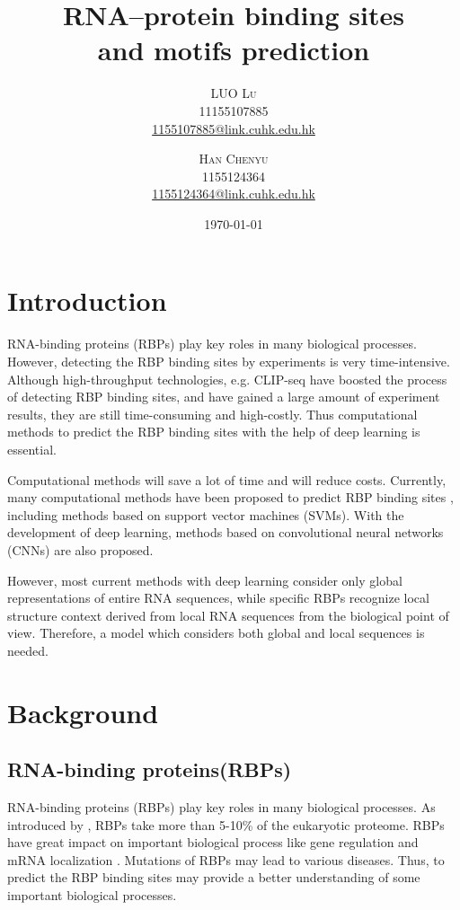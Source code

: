 \documentclass[twoside,twocolumn]{article}
\title{RNA–protein binding sites \\ and motifs prediction} %
\author{%
\textsc{LUO Lu} \\[1ex] %
\normalsize 11155107885 \\ %
\normalsize \href{mailto:1155107885@link.cuhk.edu.hk}{1155107885@link.cuhk.edu.hk}
\and
\textsc{Han Chenyu}\\[1ex] %
\normalsize 1155124364 \\ %
\normalsize \href{mailto:1155124364@link.cuhk.edu.hk}{1155124364@link.cuhk.edu.hk} %
}
\date{\today} %
\begin{document}
\maketitle


\section{Introduction}

\lettrine[nindent=0em,lines=3]{R} NA-binding proteins (RBPs) play key roles in 
many biological processes. However, detecting the RBP binding sites by 
experiments is very time-intensive. 
Although high-throughput technologies, e.g. CLIP-seq \cite{ref5} have
boosted the process of detecting RBP binding sites, and have gained a large amount
of experiment results, they are still time-consuming and high-costly.
Thus computational 
methods to predict the RBP binding sites with the help of deep learning is 
essential. 

Computational methods will save a lot of time and will reduce costs. 
Currently, many computational methods have been proposed to predict RBP binding
sites \cite{ref6}, including methods based on support vector machines
(SVMs). With the development of deep learning, methods based on convolutional
neural networks (CNNs) are also proposed.

However, most current methods with deep learning consider only global 
representations of entire RNA sequences, while specific RBPs recognize 
local structure context derived from local RNA sequences from the biological 
point of view. Therefore, a model which considers both global and local 
sequences is needed.


\section{Background}
    \subsection{RNA-binding proteins(RBPs)}
    RNA-binding proteins (RBPs) play key roles in 
    many biological processes. As introduced by \cite{ref7}, RBPs 
    take more than 5-10\% of the eukaryotic proteome. RBPs have great impact 
    on important biological process like gene regulation \cite{ref8} and mRNA 
    localization \cite{ref9}. Mutations of RBPs 
    may lead to various diseases. Thus, to predict the RBP binding sites may
    provide a better understanding of some important biological processes.
\end{document}
